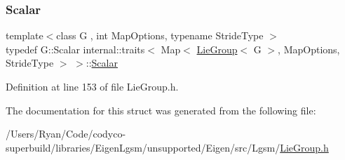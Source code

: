\subsubsection{\texorpdfstring{Scalar}{Scalar}}
{\footnotesize\ttfamily template$<$class G , int Map\+Options, typename Stride\+Type $>$ \\
typedef G\+::\+Scalar internal\+::traits$<$ Map$<$ \hyperlink{class_lie_group}{Lie\+Group}$<$ G $>$, Map\+Options, Stride\+Type $>$ $>$\+::\hyperlink{structinternal_1_1traits_3_01_map_3_01_lie_group_3_01_g_01_4_00_01_map_options_00_01_stride_type_01_4_01_4_ac813c011f308189694ce54531fa28da5}{Scalar}}



Definition at line 153 of file Lie\+Group.\+h.



The documentation for this struct was generated from the following file\+:\begin{DoxyCompactItemize}
\item 
/\+Users/\+Ryan/\+Code/codyco-\/superbuild/libraries/\+Eigen\+Lgsm/unsupported/\+Eigen/src/\+Lgsm/\hyperlink{_lie_group_8h}{Lie\+Group.\+h}\end{DoxyCompactItemize}
